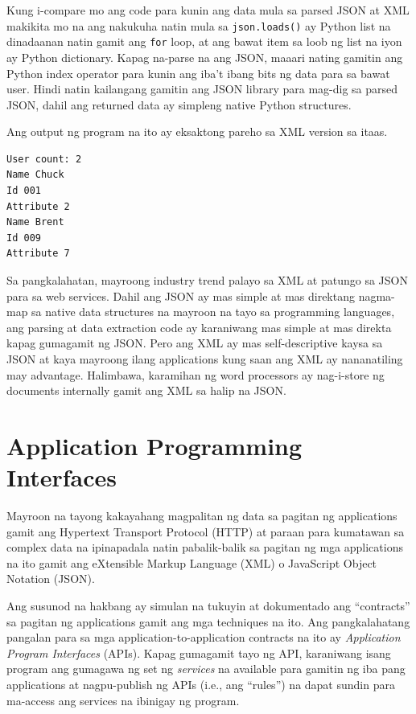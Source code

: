 \documentclass[10pt,]{book}
\begin{document}
Kung i-compare mo ang code para kunin ang data mula sa parsed JSON at
XML makikita mo na ang nakukuha natin mula sa \texttt{json.loads()} ay
Python list na dinadaanan natin gamit ang \texttt{for} loop, at ang
bawat item sa loob ng list na iyon ay Python dictionary. Kapag na-parse
na ang JSON, maaari nating gamitin ang Python index operator para kunin
ang iba't ibang bits ng data para sa bawat user. Hindi natin kailangang
gamitin ang JSON library para mag-dig sa parsed JSON, dahil ang returned
data ay simpleng native Python structures.

Ang output ng program na ito ay eksaktong pareho sa XML version sa
itaas.

{\small
\begin{verbatim}
User count: 2
Name Chuck
Id 001
Attribute 2
Name Brent
Id 009
Attribute 7
\end{verbatim}
}

Sa pangkalahatan, mayroong industry trend palayo sa XML at patungo sa
JSON para sa web services. Dahil ang JSON ay mas simple at mas direktang
nagma-map sa native data structures na mayroon na tayo sa programming
languages, ang parsing at data extraction code ay karaniwang mas simple
at mas direkta kapag gumagamit ng JSON. Pero ang XML ay mas
self-descriptive kaysa sa JSON at kaya mayroong ilang applications kung
saan ang XML ay nananatiling may advantage. Halimbawa, karamihan ng word
processors ay nag-i-store ng documents internally gamit ang XML sa halip
na JSON.

\section{Application Programming
Interfaces}\label{application-programming-interfaces}

Mayroon na tayong kakayahang magpalitan ng data sa pagitan ng
applications gamit ang Hypertext Transport Protocol (HTTP) at paraan
para kumatawan sa complex data na ipinapadala natin pabalik-balik sa
pagitan ng mga applications na ito gamit ang eXtensible Markup Language
(XML) o JavaScript Object Notation (JSON).

Ang susunod na hakbang ay simulan na tukuyin at dokumentado ang
``contracts'' sa pagitan ng applications gamit ang mga techniques na
ito. Ang pangkalahatang pangalan para sa mga application-to-application
contracts na ito ay \emph{Application Program Interfaces} (APIs). Kapag
gumagamit tayo ng API, karaniwang isang program ang gumagawa ng set ng
\emph{services} na available para gamitin ng iba pang applications at
nagpu-publish ng APIs (i.e., ang ``rules'') na dapat sundin para
ma-access ang services na ibinigay ng program.
\end{document}
